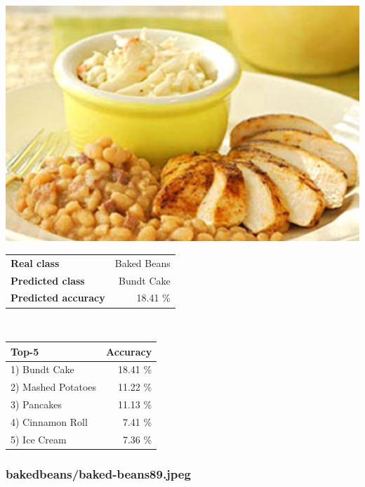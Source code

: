 \begin{minipage}[t]{0.4\textwidth}
	\vspace{0pt}
	\includegraphics[width=\linewidth]{images/evaluation-images/baked_beans/baked-beans116.png}
\end{minipage}
\hfill
\begin{minipage}[t]{0.5\textwidth}
	\vspace{0pt}\raggedright
	\begin{tabularx}{\textwidth}{X r}
		\small \textbf{Real class} & \small Baked Beans\\
		\small \textbf{Predicted class} & \small Bundt Cake\\
		\small \textbf{Predicted accuracy} & \small 18.41 \%
    \end{tabularx}\\
    
    \vspace{6pt}
	\begin{tabularx}{\textwidth}{X r}
        \small \textbf{Top-5} & \small \textbf{Accuracy} \\
        \hline
		\small 1) Bundt Cake & \small 18.41 \%\\\small 2) Mashed Potatoes & \small 11.22 \%\\\small 3) Pancakes & \small 11.13 \%\\\small 4) Cinnamon Roll & \small 7.41 \%\\\small 5) Ice Cream & \small 7.36 \%
    \end{tabularx}
\end{minipage}
    
\subsubsection{baked\textunderscore beans/baked-beans89.jpeg}


